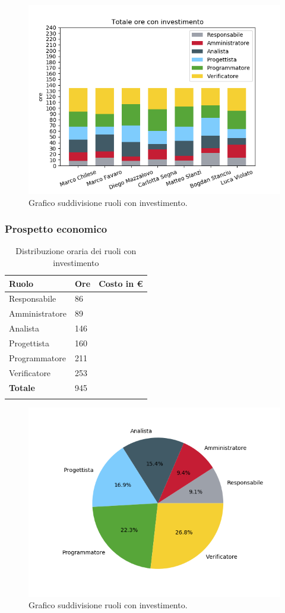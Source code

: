 \begin{figure}[H]
	\centering
  		\includegraphics[width=1\linewidth]{./images/fig_toi.png}
  		\caption{Grafico suddivisione ruoli con investimento.}
  		\label{fig:grafico suddivione ruoli con investimento}
\end{figure}

\subsubsection{Prospetto economico}

\begin{longtable}{| C{.30\textwidth}| C{.15\textwidth}| C{.20\textwidth}|}
\hline
\textbf{Ruolo} & \textbf{Ore} & \textbf{Costo in \euro} \\
\hline 
Responsabile & 86 & \\
\hline
Amministratore & 89 &  \\
\hline
Analista & 146 &  \\
\hline 
Progettista & 160 & \\
\hline
Programmatore & 211 &  \\
\hline
Verificatore & 253 &  \\
\hline
\textbf{Totale} & 945 &  \\
\hline
\caption{Distribuzione oraria dei ruoli con investimento}
\label{Distribuzione oraria ruoli con investimento}
\end{longtable}

\begin{figure}[H]
	\centering
  		\includegraphics[width=0.8\linewidth]{./images/torta_toci.png}
  		\caption{Grafico suddivisione ruoli con investimento.}
  		\label{fig:grafico suddivione ruoli con investimento}
\end{figure}



